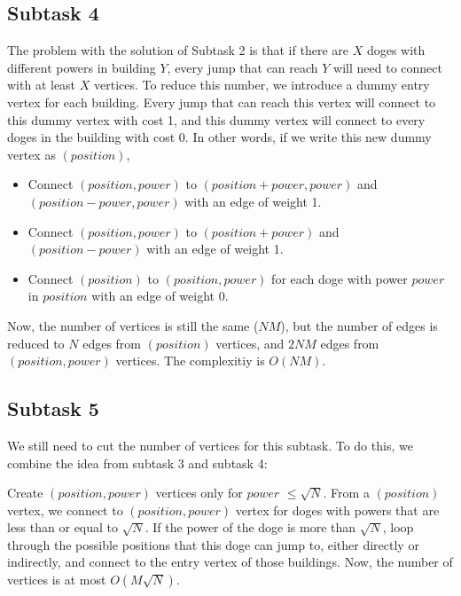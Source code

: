 \documentclass[a4paper]{article}
\begin{document}
\subsection*{Subtask 4}
The problem with the solution of Subtask 2 is that if there are $X$ doges with different powers in building $Y$, every jump that can reach $Y$ will need to connect with at least $X$ vertices. To reduce this number, we introduce a dummy entry vertex for each building. Every jump that can reach this vertex will connect to this dummy vertex with cost 1, and this dummy vertex will connect to every doges in the building with cost 0. In other words, if we write this new dummy vertex as $(position)$,
\begin{itemize}
	\item Connect $(position, power)$ to $(position + power, power)$ and $(position - power, power)$ with an edge of weight 1.
	\item Connect $(position, power)$ to $(position + power)$ and $(position - power)$ with an edge of weight 1.
	\item Connect $(position)$ to $(position, power)$ for each doge with power $power$ in $position$ with an edge of weight 0.
\end{itemize}
Now, the number of vertices is still the same ($NM$), but the number of edges is reduced to $N$ edges from $(position)$ vertices, and $2NM$ edges from $(position, power)$ vertices. The complexitiy is $O(NM)$.

\subsection*{Subtask 5}
We still need to cut the number of vertices for this subtask. To do this, we combine the idea from subtask 3 and subtask 4:

Create $(position, power)$ vertices only for $power$ $\leq \sqrt{N}$.
From a $(position)$ vertex, we connect to $(position, power)$ vertex for doges with powers that are less than or equal to $\sqrt{N}$.
If the power of the doge is more than $\sqrt{N}$, loop through the possible positions that this doge can jump to, either directly or indirectly, and connect to the entry vertex of those buildings.
Now, the number of vertices is at most $O(M\sqrt{N})$.
\end{document}
